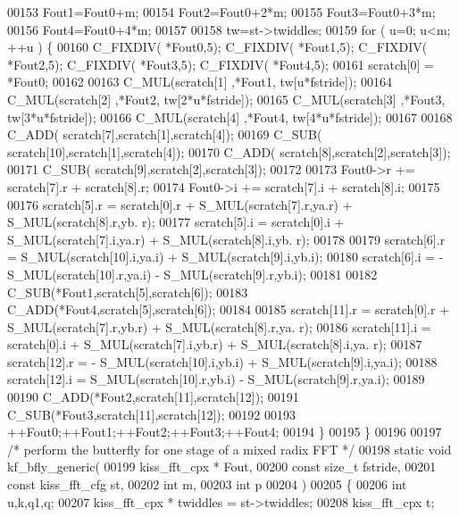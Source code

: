 \begin{DoxyCode}
00153     Fout1=Fout0+m;
00154     Fout2=Fout0+2*m;
00155     Fout3=Fout0+3*m;
00156     Fout4=Fout0+4*m;
00157 
00158     tw=st->twiddles;
00159     \textcolor{keywordflow}{for} ( u=0; u<m; ++u ) \{
00160         C_FIXDIV( *Fout0,5); C_FIXDIV( *Fout1,5); C_FIXDIV( *Fout2,5); C_FIXDIV( *Fout3,5); 
      C_FIXDIV( *Fout4,5);
00161         scratch[0] = *Fout0;
00162 
00163         C_MUL(scratch[1] ,*Fout1, tw[u*fstride]);
00164         C_MUL(scratch[2] ,*Fout2, tw[2*u*fstride]);
00165         C_MUL(scratch[3] ,*Fout3, tw[3*u*fstride]);
00166         C_MUL(scratch[4] ,*Fout4, tw[4*u*fstride]);
00167 
00168         C_ADD( scratch[7],scratch[1],scratch[4]);
00169         C_SUB( scratch[10],scratch[1],scratch[4]);
00170         C_ADD( scratch[8],scratch[2],scratch[3]);
00171         C_SUB( scratch[9],scratch[2],scratch[3]);
00172 
00173         Fout0->r += scratch[7].r + scratch[8].r;
00174         Fout0->i += scratch[7].i + scratch[8].i;
00175 
00176         scratch[5].r = scratch[0].r + S_MUL(scratch[7].r,ya.r) + S_MUL(scratch[8].r,yb.
      r);
00177         scratch[5].i = scratch[0].i + S_MUL(scratch[7].i,ya.r) + S_MUL(scratch[8].i,yb.
      r);
00178 
00179         scratch[6].r =  S_MUL(scratch[10].i,ya.i) + S_MUL(scratch[9].i,yb.i);
00180         scratch[6].i = -S_MUL(scratch[10].r,ya.i) - S_MUL(scratch[9].r,yb.i);
00181 
00182         C_SUB(*Fout1,scratch[5],scratch[6]);
00183         C_ADD(*Fout4,scratch[5],scratch[6]);
00184 
00185         scratch[11].r = scratch[0].r + S_MUL(scratch[7].r,yb.r) + S_MUL(scratch[8].r,ya.
      r);
00186         scratch[11].i = scratch[0].i + S_MUL(scratch[7].i,yb.r) + S_MUL(scratch[8].i,ya.
      r);
00187         scratch[12].r = - S_MUL(scratch[10].i,yb.i) + S_MUL(scratch[9].i,ya.i);
00188         scratch[12].i = S_MUL(scratch[10].r,yb.i) - S_MUL(scratch[9].r,ya.i);
00189 
00190         C_ADD(*Fout2,scratch[11],scratch[12]);
00191         C_SUB(*Fout3,scratch[11],scratch[12]);
00192 
00193         ++Fout0;++Fout1;++Fout2;++Fout3;++Fout4;
00194     \}
00195 \}
00196 
00197 \textcolor{comment}{/* perform the butterfly for one stage of a mixed radix FFT */}
00198 \textcolor{keyword}{static} \textcolor{keywordtype}{void} kf_bfly_generic(
00199         kiss_fft_cpx * Fout,
00200         \textcolor{keyword}{const} \textcolor{keywordtype}{size\_t} fstride,
00201         \textcolor{keyword}{const} kiss_fft_cfg st,
00202         \textcolor{keywordtype}{int} m,
00203         \textcolor{keywordtype}{int} p
00204         )
00205 \{
00206     \textcolor{keywordtype}{int} u,k,q1,q;
00207     kiss_fft_cpx * twiddles = st->twiddles;
00208     kiss_fft_cpx t;

\end{DoxyCode}
